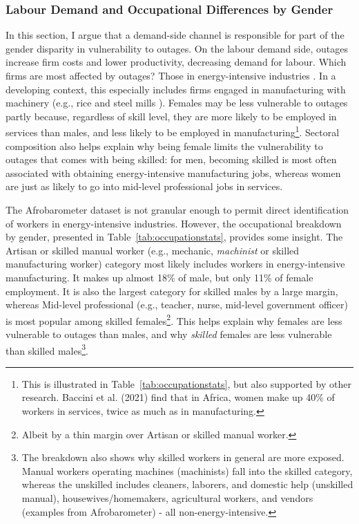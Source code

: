 \documentclass[12pt]{article}
\begin{document}
\subsubsection{Labour Demand and Occupational Differences by Gender} \label{sec:demand}
\noindent In this section, I argue that a demand-side channel is responsible for part of the gender disparity in vulnerability to outages. On the labour demand side, outages increase firm costs and lower productivity, decreasing demand for labour. Which firms are most affected by outages? Those in energy-intensive industries \cite{alam2013a}. In a developing context, this especially includes firms engaged in manufacturing with machinery (e.g., rice and steel mills \cite{alam2013a}). Females may be less vulnerable to outages partly because, regardless of skill level, they are more likely to be employed in services than males, and less likely to be employed in manufacturing\footnote{This is illustrated in Table~\ref{tab:occupationstats}, but also supported by other research. Baccini et al. (2021) \cite{baccini2021a} find that in Africa, women make up 40\% of workers in services, twice as much as in manufacturing.}. Sectoral composition also helps explain why being female limits the vulnerability to outages that comes with being skilled: for men, becoming skilled is most often associated with obtaining energy-intensive manufacturing jobs, whereas women are just as likely to go into mid-level professional jobs in services.
\par
The Afrobarometer dataset is not granular enough to permit direct identification of workers in energy-intensive industries. However, the occupational breakdown by gender, presented in Table~\ref{tab:occupationstats}, provides some insight. The Artisan or skilled manual worker (e.g., mechanic, \textit{machinist} or skilled manufacturing worker) category most likely includes workers in energy-intensive manufacturing. It makes up almost 18\% of male, but only 11\% of female employment. It is also the largest category for skilled males by a large margin, whereas Mid-level professional (e.g., teacher, nurse, mid-level government officer) is most popular among skilled females\footnote{Albeit by a thin margin over Artisan or skilled manual worker.}. This helps explain why females are less vulnerable to outages than males, and why \textit{skilled} females are less vulnerable than skilled males\footnote{The breakdown also shows why skilled workers in general are more exposed. Manual workers operating machines (machinists) fall into the skilled category, whereas the unskilled includes cleaners, laborers, and domestic help (unskilled manual), housewives/homemakers, agricultural workers, and vendors (examples from Afrobarometer) - all non-energy-intensive.}. 
\end{document}
